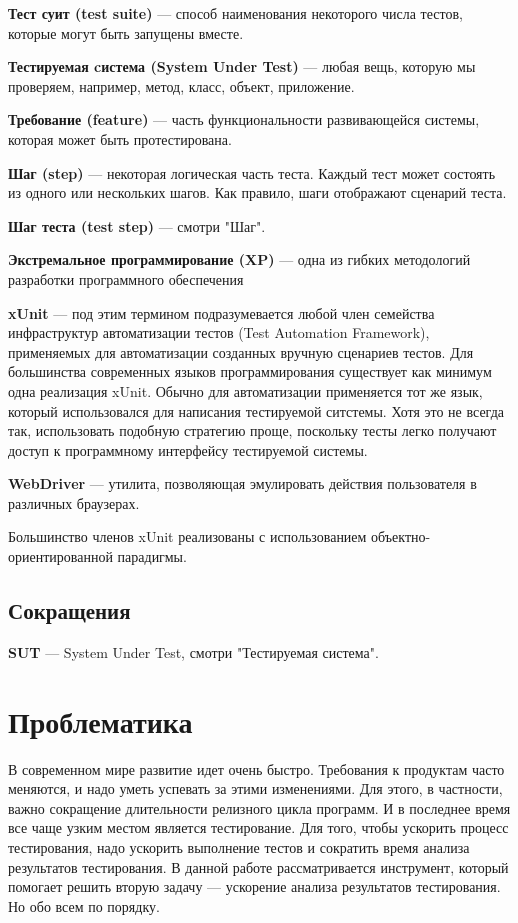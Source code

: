 {\bf Тест суит (test suite)} ---
способ наименования некоторого числа тестов, которые могут быть запущены вместе.

{\bf Тестируемая cистема (System Under Test)} ---
любая вещь, которую мы проверяем, например, метод, класс, объект, приложение.

{\bf Требование (feature)} ---
часть функциональности развивающейся системы, которая может быть протестирована.

{\bf Шаг (step)} ---
некоторая логическая часть теста. Каждый тест может состоять из одного или нескольких шагов. Как правило, шаги отображают сценарий теста.

{\bf Шаг теста (test step)} ---
смотри "Шаг".

{\bf Экстремальное программирование (XP)} ---
одна из гибких методологий разработки программного обеспечения

{\bf xUnit} ---
под этим термином подразумевается любой член семейства инфраструктур автоматизации тестов (Test Automation Framework), применяемых для автоматизации созданных вручную сценариев тестов. Для большинства современных языков программирования существует как минимум одна реализация xUnit. Обычно для автоматизации применяется тот же язык, который использовался для написания тестируемой ситстемы. Хотя это не всегда так, использовать подобную стратегию проще, поскольку тесты легко получают доступ к программному интерфейсу тестируемой системы.

{\bf WebDriver} ---
утилита, позволяющая эмулировать действия пользователя в различных браузерах.

Большинство членов xUnit реализованы с использованием объектно-ориентированной парадигмы.

\subsection{Сокращения}

{\bf SUT} --- System Under Test, смотри "Тестируемая система".

\section{Проблематика}

В современном мире развитие идет очень быстро. Требования к продуктам часто меняются, и надо уметь успевать за этими изменениями. Для этого, в частности, важно сокращение длительности релизного цикла программ. И в последнее время все чаще узким местом является тестирование. Для того, чтобы ускорить процесс тестирования, надо ускорить выполнение тестов и сократить время анализа результатов тестирования. В данной работе рассматривается инструмент, который помогает решить вторую задачу --- ускорение анализа результатов тестирования. Но обо всем по порядку.

